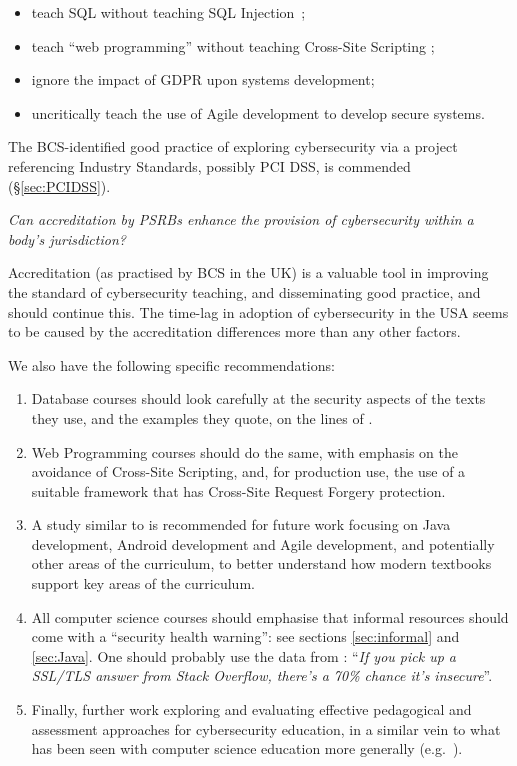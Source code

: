 \documentclass[conference]{IEEEtran}
\begin{document}
{\begin{description}
\begin{itemize}
	\item teach SQL without teaching SQL Injection~\cite{Drop2019};
	\item teach ``web programming'' without teaching Cross-Site Scripting \cite[(XSS)]{OWASP2017a};
	\item ignore the  impact of GDPR upon systems development;
	\item uncritically teach the use of Agile development to develop secure systems.
\end{itemize}

The BCS-identified good practice of exploring cybersecurity via a project referencing Industry Standards, possibly PCI DSS, is commended (\S\ref{sec:PCIDSS}).

\item[RQ3:] {\emph{Can accreditation by PSRBs enhance the provision of cybersecurity within a body's jurisdiction?}}

Accreditation (as practised by BCS in the UK) is a valuable tool in improving the standard of cybersecurity teaching, and disseminating good practice, and should continue this. The time-lag in adoption of cybersecurity in the USA seems to be caused by the accreditation differences more than any other factors.
\end{description}

We also have the following specific recommendations:

\begin{enumerate}
\item Database courses should look carefully at the security aspects of the texts they use, and the examples they quote, on the lines of \cite{Drop2019}.
\item Web Programming courses should  do the same, with emphasis on the avoidance of Cross-Site Scripting, and, for production use, the use of a suitable framework that has Cross-Site Request Forgery protection. 
\item A study similar to \cite{Drop2019} is recommended for future work focusing on Java development, Android development and Agile development, and potentially other areas of the curriculum, to better understand how modern textbooks support key areas of the curriculum.
\item All computer science courses should emphasise that informal resources should come with a ``security health warning'': see sections \ref{sec:informal} and \ref{sec:Java}. One should probably use the data from \cite{Chenetal2019a}: ``{\emph{If you pick up a SSL/TLS answer from Stack Overflow, there's a 70\% chance it's insecure}}''.
\item Finally, further work exploring and evaluating effective pedagogical and assessment approaches for cybersecurity education, in a similar vein to what has been seen with computer science education more generally (e.g.~\cite{davenport-et-al:latice2016}).
\end{enumerate}

}
\end{document}
